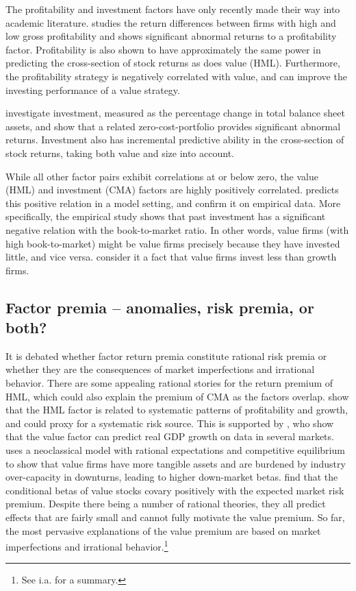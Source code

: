 The profitability and investment factors have only recently made their way into academic literature. \textcite{NovyMarx2013} studies the return differences between firms with high and low gross profitability and shows significant abnormal returns to a profitability factor. Profitability is also shown to have approximately the same power in predicting the cross-section of stock returns as does value (HML). Furthermore, the profitability strategy is negatively correlated with value, and can improve the investing performance of a value strategy. 

\textcite{CooperGulenSchill2008} investigate investment, measured as the percentage change in total balance sheet assets, and show that a related zero-cost-portfolio provides significant abnormal returns. Investment also has incremental predictive ability in the cross-section of stock returns, taking both value and size into account.

While all other factor pairs exhibit correlations at or below zero, the value (HML) and investment (CMA) factors are highly positively correlated. \textcite{Zhang2005} predicts this positive relation in a model setting, and \textcite{AndersonGarciaFeijoo2006} confirm it on empirical data. More specifically, the empirical study shows that past investment has a significant negative relation with the book-to-market ratio. In other words, value firms (with high book-to-market) might be value firms precisely because they have invested little, and vice versa. \textcite{FF2015} consider it a fact that value firms invest less than growth firms.

\subsection{Factor premia -- anomalies, risk premia, or both?}
It is debated whether factor return premia constitute rational risk premia or whether they are the consequences of market imperfections and irrational behavior. There are some appealing rational stories for the return premium of HML, which could also explain the premium of CMA as the factors overlap. \textcite{FamaFrench1993} show that the HML factor is related to systematic patterns of profitability and growth, and could proxy for a systematic risk source. This is supported by \textcite{LiewVassalou2000}, who show that the value factor can predict real GDP growth on data in several markets. \textcite{Zhang2005} uses a neoclassical model with rational expectations and competitive equilibrium to show that value firms have more tangible assets and are burdened by industry over-capacity in downturns, leading to higher down-market betas. \textcite{PetkovaZhang2005} find that the conditional betas of value stocks covary positively with the expected market risk premium. Despite there being a number of rational theories, they all predict effects that are fairly small and cannot fully motivate the value premium. So far, the most pervasive explanations of the value premium are based on market imperfections and irrational behavior.\footnote{See i.a. \textcite{Ilmanen2011} for a summary.}

